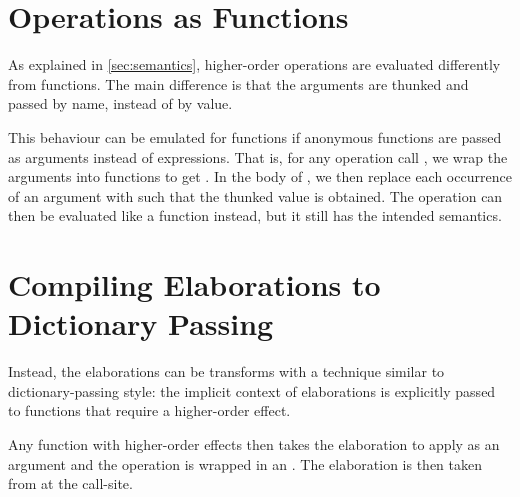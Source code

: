 \section{Operations as Functions}

As explained in \cref{sec:semantics}, higher-order operations are evaluated differently from functions. The main difference is that the arguments are thunked and passed by name, instead of by value. 

This behaviour can be emulated for functions if anonymous functions are passed as arguments instead of expressions. That is, for any operation call , we wrap the arguments into functions to get . In the body of , we then replace each occurrence of an argument  with  such that the thunked value is obtained. The  operation can then be evaluated like a function instead, but it still has the intended semantics.

\section{Compiling Elaborations to Dictionary Passing}

Instead, the elaborations can be transforms with a technique similar to dictionary-passing style: the implicit context of elaborations is explicitly passed to functions that require a higher-order effect.

Any function with higher-order effects then takes the elaboration to apply as an argument and the operation is wrapped in an . The elaboration is then taken from  at the call-site.

